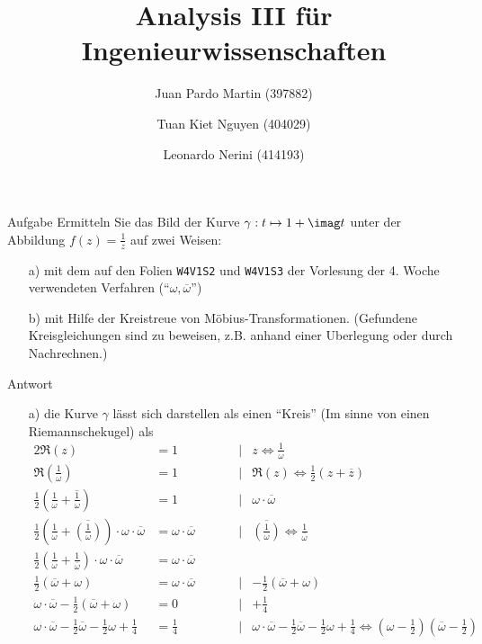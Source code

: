 \documentclass{scrartcl}
\title{Analysis III für Ingenieurwissenschaften}
\author{Juan Pardo Martin (397882)\and Tuan Kiet Nguyen (404029)\and Leonardo Nerini (414193)}
\let\*\cdot
\let\>\Leftrightarrow
\begin{document}
\maketitle
\begin{section}{Aufgabe}%
Ermitteln Sie das Bild der Kurve $\gamma : t \mapsto 1 + \imag t$ unter der Abbildung $f(z) = \frac 1 z$
auf zwei Weisen:
\begin{itemize}
\item[a)]  mit dem auf den Folien \texttt{W4V1S2} und \texttt{W4V1S3} der Vorlesung der 4. Woche verwendeten Verfahren (\enquote{$\omega, \overline{\omega}$})
\item[b)] mit Hilfe der Kreistreue von Möbius-Transformationen. (Gefundene Kreisgleichungen sind zu beweisen, z.B. anhand einer Uberlegung oder durch Nachrechnen.) 
\end{itemize}
\begin{subsection}{Antwort}
\begin{itemize}
\item[a)]  die Kurve $\gamma$ lässt sich darstellen als einen \enquote{Kreis} (Im sinne von einen Riemannschekugel) als 
\begin{alignat*}{2}
    \Re(z)&=1\quad\quad\quad\quad &|&z\>\frac 1 \omega\\
    \Re(\frac {1}{ \omega})&=1 &|&\Re(z)\>\frac 1 2 \left(z+\overline{z}\right)\\
    \frac 1 2 \left(\frac {1}{ \omega}+\overline{\frac {1}{ \omega}}\right)&=1 &|&\omega\*\overline{\omega}\\
    \frac 1 2 \left(\frac {1}{ \omega}+\overline{\left(\frac {1}{ \omega}\right)}\right)\*\omega\*\overline{\omega}&=\omega\*\overline{\omega} &|&\overline{\left(\frac {1}{ \omega}\right)}\> \frac{1}{\overline{\omega}}\\
   \frac 1 2 \left(\frac {1}{ \omega}+\frac{1}{\overline{\omega}}\right)\*\omega\*\overline{\omega}&=\omega\*\overline{\omega} \\
  \frac 1 2 \left(\overline{\omega}+\omega \right)&=\omega\*\overline{\omega} &|&-\frac 1 2 \left(\overline{\omega}+\omega \right)\\
  \omega\*\overline{\omega}-\frac 1 2 \left(\overline{\omega}+\omega \right)&=0 &|&+\frac{1}{4}\\
  \omega\*\overline{\omega}-\frac{1}{2}\overline{\omega}-\frac{1}{2}\omega+\frac{1}{4}&=\frac{1}{4}&|&\omega\*\overline{\omega}-\frac{1}{2}\overline{\omega}-\frac{1}{2}\omega+\frac{1}{4}\>\left(\omega-\frac{1}{2}\right)\left(\overline{\omega}-\frac{1}{2}\right)\\

\end{alignat*}
\end{itemize}
\end{subsection}
\end{section}
\end{document}
